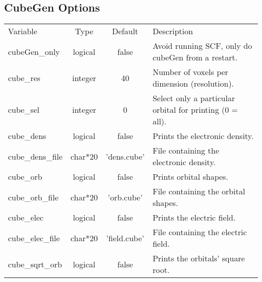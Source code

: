 \documentclass[journal=jctcce,manuscript=article]{achemso}
\begin{document}
    \subsection{CubeGen Options}
    \begin{table}  [H]
      \begin{center}
      \begin{tabular}{ l c c l}
         Variable & Type & Default & Description \\
         cubeGen\_only & logical & false & Avoid running SCF, only do cubeGen from a restart.\\
         cube\_res & integer & 40 & Number of voxels per dimension (resolution).\\
         cube\_sel & integer & 0  & Select only a particular orbital for printing (0 = all). \\
         cube\_dens & logical & false & Prints the electronic density.  \\
         cube\_dens\_file & char*20 & 'dens.cube' & File containing the electronic density. \\
         cube\_orb & logical & false & Prints orbital shapes. \\
         cube\_orb\_file & char*20 & 'orb.cube' & File containing the orbital shapes. \\
         cube\_elec & logical & false & Prints the electric field. \\
         cube\_elec\_file & char*20 & 'field.cube' & File containing the electric field. \\
         cube\_sqrt\_orb & logical & false & Prints the orbitals' square root.\\
       \end{tabular}
       \end{center}
      \label{lio.ecp.var.1}
    \end{table}    
    
\end{document}
